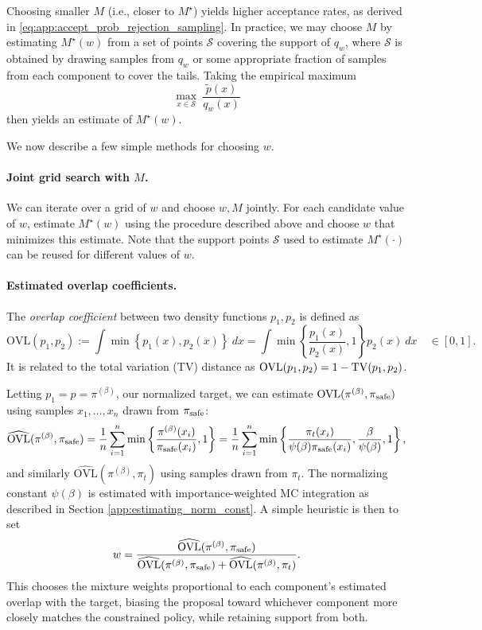 Choosing smaller $M$ (i.e., closer to $M^\star$) yields higher acceptance rates, as derived in \autoref{eq:app:accept_prob_rejection_sampling}. In practice, we may choose $M$ by estimating $M^\star(w)$ from a set of points $\mathcal{S}$ covering the support of $q_w$, where $\mathcal{S}$ is obtained by drawing samples from $q_w$ or some appropriate fraction of samples from each component to cover the tails. Taking the empirical maximum 
$$\max_{x \in \mathcal{S}} \ \frac{\tilde p(x) }{ q_w(x) }$$ 
then yields an estimate of $M^\star (w)$.

We now describe a few simple methods for choosing $w$.
\paragraph{Joint grid search with $M$.} 
We can iterate over a grid of $w$ and choose $w, M$ jointly. For each candidate value of $w$, estimate $M^\star(w)$ using the procedure described above and choose $w$ that minimizes this estimate. Note that the support points $\mathcal{S}$ used to estimate $M^\star(\cdot)$ can be reused for different values of $w$.

\paragraph{Estimated overlap coefficients.}
The \textit{overlap coefficient} between two density functions $p_1, p_2$ is defined as
$$
\mathrm{OVL}(p_1, p_2):=\int \min \left\{ p_1(x), p_2(x) \right\} \ dx = \int \min \left\{ \frac{p_1(x)}{p_2(x)}, 1 \right\} p_2(x) \ dx \quad \in [0, 1].
$$
It is related to the total variation (TV) distance as $\mathrm{OVL}(p_1, p_2) = 1 - {\rm TV}(p_1, p_2)$.

Letting $p_1 = p = \pi^{(\beta)}$, our normalized target, 
we can estimate $\mathrm{OVL}(\pi^{(\beta)}, \pi_{\rm safe})$ using samples $x_1, \dotsc, x_n$ drawn from $\pi_{\rm safe}$:
\begin{align}
\widehat{\mathrm{OVL}}(\pi^{(\beta)}, \pi_{\rm safe})
=
\frac{1}{n}\sum_{i=1}^n \min \left\{\frac{\pi^{(\beta)}(x_i)}{\pi_{\rm safe}(x_i)}, 1\right\}
=
\frac{1}{n}\sum_{i=1}^n \min \left\{\frac{\pi_t(x_i)}{\psi(\beta) \pi_{\rm safe}(x_i)}, \frac{\beta}{\psi(\beta)}, 1\right\},
\label{eq:ovl_hat_safe}
\end{align}
and similarly $\widehat{\mathrm{OVL}}(\pi^{(\beta)}, \pi_t)$ using samples drawn from $\pi_t$.
The normalizing constant $\psi(\beta)$ is estimated with importance-weighted MC integration as described in Section \ref{app:estimating_norm_const}. 
A simple heuristic is then to set
\begin{align}
w
=
\frac{\widehat{\mathrm{OVL}}(\pi^{(\beta)}, \pi_{\rm safe})}{\widehat{\mathrm{OVL}}(\pi^{(\beta)}, \pi_{\rm safe})+\widehat{\mathrm{OVL}}(\pi^{(\beta)}, \pi_t)}.
\label{eq:w_overlap_heuristic}
\end{align}
This chooses the mixture weights proportional to each component's estimated overlap with the target, biasing the proposal
toward whichever component more closely matches the constrained policy, while retaining support from both.

